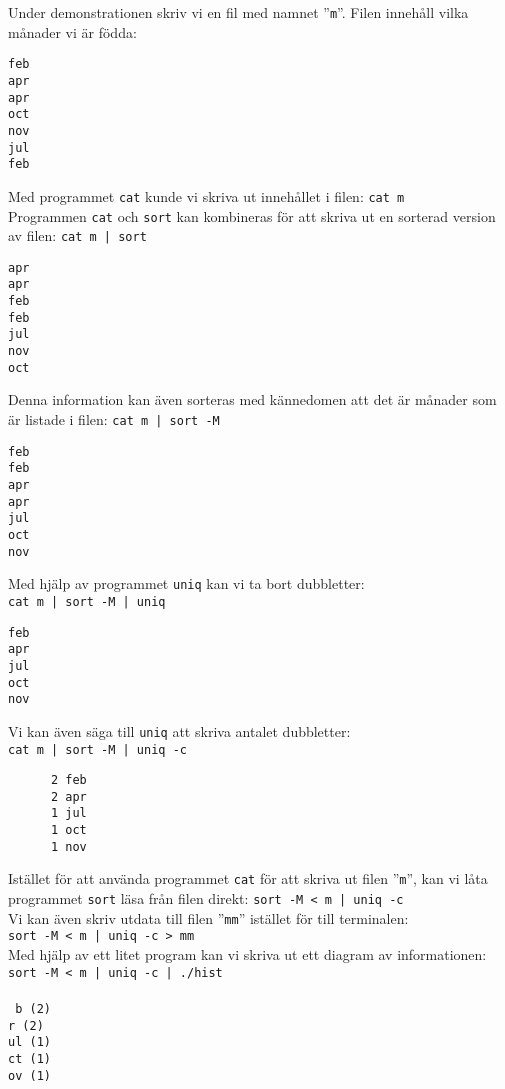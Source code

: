\documentclass[12pt,a4paper]{article}
\newcommand{\reversevideo}[1]{\colorbox{black}{\!\phantom{X}\!\!\!\color{white}{#1\!}}}
\begin{document}
\noindent
Under demonstrationen skriv vi en fil med namnet
''\texttt{m}''. Filen innehåll vilka månader vi
är födda:
\begin{verbatim}
feb
apr
apr
oct
nov
jul
feb
\end{verbatim}

\noindent
Med programmet \texttt{cat} kunde vi skriva ut
innehållet i filen: \texttt{cat m}
\\

\noindent
Programmen \texttt{cat} och \texttt{sort} kan
kombineras för att skriva ut en sorterad version
av filen: \texttt{cat m | sort}
\begin{verbatim}
apr
apr
feb
feb
jul
nov
oct
\end{verbatim}
\newpage

\noindent
Denna information kan även sorteras med
kännedomen att det är månader som är listade
i filen: \texttt{cat m | sort -M}
\begin{verbatim}
feb
feb
apr
apr
jul
oct
nov
\end{verbatim}

\noindent
Med hjälp av programmet \texttt{uniq} kan vi
ta bort dubbletter:\\\texttt{cat m | sort -M | uniq}
\begin{verbatim}
feb
apr
jul
oct
nov
\end{verbatim}

\noindent
Vi kan även säga till \texttt{uniq} att skriva
antalet dubbletter:\\\texttt{cat m | sort -M | uniq -c}
\begin{verbatim}
      2 feb
      2 apr
      1 jul
      1 oct
      1 nov
\end{verbatim}

\noindent
Istället för att använda programmet \texttt{cat}
för att skriva ut filen ''\texttt{m}'', kan vi
låta programmet \texttt{sort} läsa från filen
direkt: \texttt{sort -M < m | uniq -c}
\\

\noindent
Vi kan även skriv utdata till filen ''\texttt{mm}'' istället
för till terminalen:\\\texttt{sort -M < m | uniq -c > mm}
\\

\noindent
Med hjälp av ett litet program kan vi skriva ut ett
diagram av informationen:\\
\texttt{sort -M < m | uniq -c | ./hist}
\\\\
\tt
\reversevideo{fe}b (2)\\
\reversevideo{ap}r (2)\\
\reversevideo{j}ul (1)\\
\reversevideo{o}ct (1)\\
\reversevideo{n}ov (1)
\rm
\newpage
\end{document}
